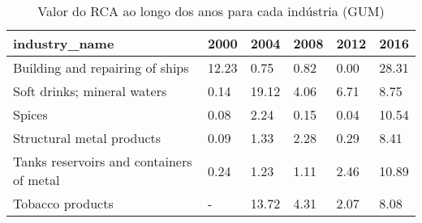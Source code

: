 \begin{table}
\centering
\caption{Valor do RCA ao longo dos anos para cada indústria (GUM)}
\begin{tabular}{p{6cm}p{1.5cm}p{1.5cm}p{1.5cm}p{1.5cm}p{1.5cm}}
\toprule
                           industry\_name &  2000 &  2004 & 2008 & 2012 &  2016 \\
\midrule
         Building and repairing of ships & 12.23 &  0.75 & 0.82 & 0.00 & 28.31 \\
             Soft drinks; mineral waters &  0.14 & 19.12 & 4.06 & 6.71 &  8.75 \\
                                  Spices &  0.08 &  2.24 & 0.15 & 0.04 & 10.54 \\
               Structural metal products &  0.09 &  1.33 & 2.28 & 0.29 &  8.41 \\
Tanks reservoirs and containers of metal &  0.24 &  1.23 & 1.11 & 2.46 & 10.89 \\
                        Tobacco products &     - & 13.72 & 4.31 & 2.07 &  8.08 \\
\bottomrule
\end{tabular}
\end{table}
